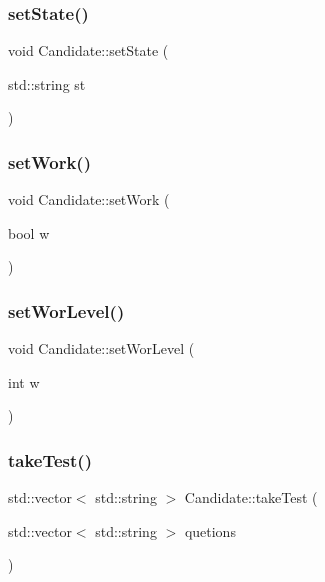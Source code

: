\subsubsection{\texorpdfstring{set\+State()}{setState()}}
{\footnotesize\ttfamily void Candidate\+::set\+State (\begin{DoxyParamCaption}\item[{std\+::string}]{st }\end{DoxyParamCaption})\hspace{0.3cm}{\ttfamily [inline]}}

\hypertarget{class_candidate_ac500f9465747b144c7807b26987c2a3e}{}\label{class_candidate_ac500f9465747b144c7807b26987c2a3e} 
\subsubsection{\texorpdfstring{set\+Work()}{setWork()}}
{\footnotesize\ttfamily void Candidate\+::set\+Work (\begin{DoxyParamCaption}\item[{bool}]{w }\end{DoxyParamCaption})\hspace{0.3cm}{\ttfamily [inline]}}

\hypertarget{class_candidate_ab526dc6819fcfb14821a7ba68c543d34}{}\label{class_candidate_ab526dc6819fcfb14821a7ba68c543d34} 
\subsubsection{\texorpdfstring{set\+Wor\+Level()}{setWorLevel()}}
{\footnotesize\ttfamily void Candidate\+::set\+Wor\+Level (\begin{DoxyParamCaption}\item[{int}]{w }\end{DoxyParamCaption})\hspace{0.3cm}{\ttfamily [inline]}}

\hypertarget{class_candidate_ab30f3859931c02d8cf69acb49a80c12e}{}\label{class_candidate_ab30f3859931c02d8cf69acb49a80c12e} 
\subsubsection{\texorpdfstring{take\+Test()}{takeTest()}}
{\footnotesize\ttfamily std\+::vector$<$ std\+::string $>$ Candidate\+::take\+Test (\begin{DoxyParamCaption}\item[{std\+::vector$<$ std\+::string $>$}]{quetions }\end{DoxyParamCaption})}

